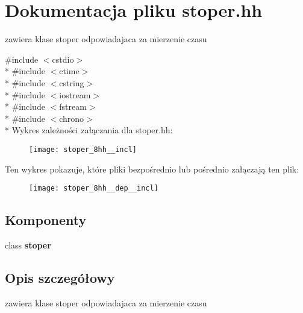 \section{Dokumentacja pliku stoper.\+hh}
\label{stoper_8hh}


zawiera klase stoper odpowiadajaca za mierzenie czasu  


{\ttfamily \#include $<$cstdio$>$}\\*
{\ttfamily \#include $<$ctime$>$}\\*
{\ttfamily \#include $<$cstring$>$}\\*
{\ttfamily \#include $<$iostream$>$}\\*
{\ttfamily \#include $<$fstream$>$}\\*
{\ttfamily \#include $<$chrono$>$}\\*
Wykres zależności załączania dla stoper.\+hh\+:\nopagebreak
\begin{figure}[H]
\begin{center}
\leavevmode
\texttt{[image: stoper\_8hh\_\_incl]}
\end{center}
\end{figure}
Ten wykres pokazuje, które pliki bezpośrednio lub pośrednio załączają ten plik\+:\nopagebreak
\begin{figure}[H]
\begin{center}
\leavevmode
\texttt{[image: stoper\_8hh\_\_dep\_\_incl]}
\end{center}
\end{figure}
\subsection*{Komponenty}
\begin{DoxyCompactItemize}
\item 
class {\bf stoper}
\end{DoxyCompactItemize}


\subsection{Opis szczegółowy}
zawiera klase stoper odpowiadajaca za mierzenie czasu 

